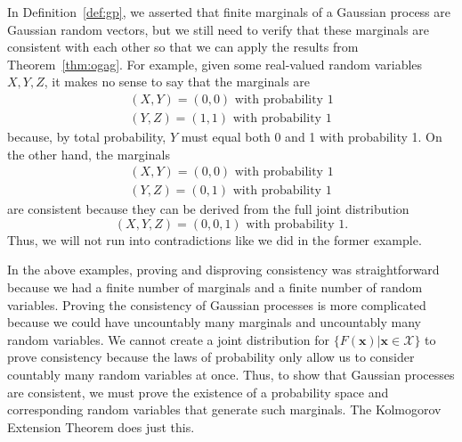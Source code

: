 In Definition~\ref{def:gp}, we asserted that finite marginals of a Gaussian process are Gaussian random vectors, but we still need to verify that these marginals are consistent with each other so that we can apply the results from Theorem~\ref{thm:ogag}.
For example, given some real-valued random variables $X, Y, Z$, it makes no sense to say that the marginals are
\begin{align*}
    (X, Y) = (0, 0) \text{ with probability 1} \\
    (Y, Z) = (1, 1) \text{ with probability 1}
\end{align*}
because, by total probability, $Y$ must equal both 0 and 1 with probability 1.
On the other hand, the marginals
\begin{align*}
    (X, Y) = (0, 0) \text{ with probability 1} \\
    (Y, Z) = (0, 1) \text{ with probability 1}
\end{align*}
are consistent because they can be derived from the full joint distribution
\begin{equation*}
    (X, Y, Z) = (0, 0, 1)  \text{ with probability 1}.
\end{equation*}
Thus, we will not run into contradictions like we did in the former example.

In the above examples, proving and disproving consistency was straightforward because we had a finite number of marginals and a finite number of random variables.
Proving the consistency of Gaussian processes is more complicated because we could have uncountably many marginals and uncountably many random variables.
We cannot create a joint distribution for $\{ F(\mathbf{x}) | \mathbf{x} \in \mathcal{X} \}$ to prove consistency because the laws of probability only allow us to consider countably many random variables at once.
Thus, to show that Gaussian processes are consistent, we must prove the existence of a probability space and corresponding random variables that generate such marginals.
The Kolmogorov Extension Theorem does just this.

